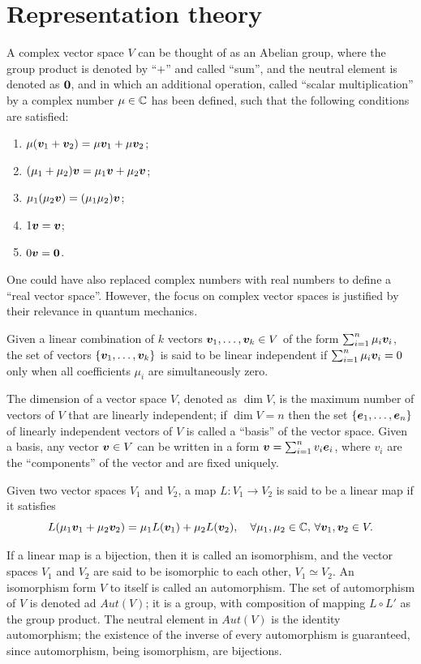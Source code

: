 \chapter{Representation theory}
A complex vector space $V$ can be thought of as an Abelian group, where the group product is denoted by ``$+$'' and called  ``sum'', and the neutral element is denoted as $\bm{0}$, and in which an additional operation, called ``scalar multiplication'' by a complex number $\mu \in \mathbb{C}$ has been defined, such that the following conditions are satisfied:
\begin{enumerate}
    \item $\mu(\bm{v}_1 + \bm{v}_2) = \mu\bm{v}_1 + \mu\bm{v}_2$;
    \item $(\mu_1 + \mu_2)\bm{v} = \mu_1\bm{v} + \mu_2\bm{v}$;
    \item $\mu_1(\mu_2\bm{v}) = (\mu_1\mu_2)\bm{v}$;
    \item $1\bm{v} = \bm{v}$;
    \item $0\bm{v} = \bm{0}$.
\end{enumerate}
One could have also replaced complex numbers with real numbers to define a ``real vector space''. However, the focus on complex vector spaces is justified by their relevance in quantum mechanics.
\begin{defn}
    Given a linear combination of $k$ vectors $\bm{v}_1,\dots,\bm{v}_k \in V$ of the form $\sum_{i=1}^n\mu_i\bm{v}_i$, the set of vectors $\{\bm{v}_1,\dots,\bm{v}_k\}$ is said to be linear independent if $\sum_{i=1}^n\mu_i\bm{v}_i = 0$ only when all coefficients $\mu_i$ are simultaneously zero. 
\end{defn}
The dimension of a vector space $V$, denoted as $\dim{V}$, is the maximum number of vectors of $V$ that are linearly independent; if $\dim{V} = n$ then the set $\{\bm{e}_1,\dots,\bm{e}_n\}$ of linearly independent vectors of $V$ is called a ``basis'' of the vector space. Given a basis, any vector $\bm{v} \in V$ can be written in a form $\bm{v} = \sum_{i=1}^nv_i\bm{e}_i$, where $v_i$ are the ``components'' of the vector and are fixed uniquely. 
\begin{defn}
    Given two vector spaces $V_1$ and $V_2$, a map $L : V_1 \to V_2$ is said to be a linear map if it satisfies 
    \begin{equation}
        L(\mu_1\bm{v}_1 + \mu_2\bm{v}_2) = \mu_1L(\bm{v}_1) + \mu_2L(\bm{v}_2),\quad \forall \mu_1,\mu_2 \in \mathbb{C},\,\forall \bm{v}_1,\bm{v}_2 \in V.
    \end{equation}
\end{defn}
If a linear map is a bijection, then it is called an isomorphism, and the vector spaces $V_1$ and $V_2$ are said to be isomorphic to each other, $V_1 \simeq V_2$. An isomorphism form $V$ to itself is called an automorphism. The set of automorphism of $V$ is denoted ad $Aut(V)$; it is a group, with composition of mapping $L \circ L'$ as the group product. The neutral element in $Aut(V)$ is the identity automorphism; the existence of the inverse of every automorphism is guaranteed, since automorphism, being isomorphism, are bijections. 
